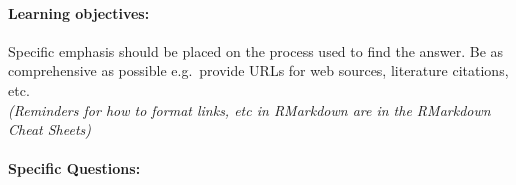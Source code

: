 \documentclass[]{article}
\title{}
\author{}
\date{}
\let\oldparagraph\paragraph
\renewcommand{\paragraph}[1]{\oldparagraph{#1}\mbox{}}
\begin{document}
\paragraph{Learning objectives:}\label{learning-objectives}

Specific emphasis should be placed on the process used to find the
answer. Be as comprehensive as possible e.g.~provide URLs for web
sources, literature citations, etc.\\
\emph{(Reminders for how to format links, etc in RMarkdown are in the
RMarkdown Cheat Sheets)}

\paragraph{Specific Questions:}\label{specific-questions}
\end{document}
